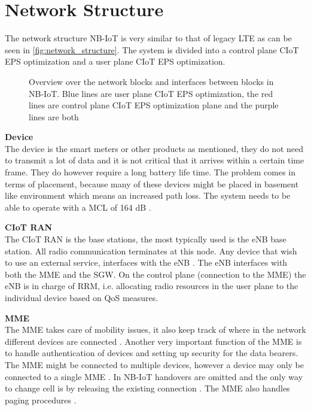  \section{Network Structure}

The network structure \gls{NB-IoT} is very similar to that of legacy \gls{LTE} as can be seen in \autoref{fig:network_structure}. The system is divided into a control plane \gls{CIoT} \gls{EPS} optimization and a user plane \gls{CIoT} \gls{EPS} optimization.

\begin{figure}[H]
\centering

\caption{Overview over the network blocks and interfaces between blocks in \gls{NB-IoT}. Blue lines are user plane \gls{CIoT} \gls{EPS} optimization, the red lines are control plane \gls{CIoT} \gls{EPS} optimization plane and the purple lines are both \citep{NB_slide}}
\label{fig:network_structure}
\end{figure}


\textbf{Device}\\
The device is the smart meters or other products as mentioned, they do not need to transmit a lot of data and it is not critical that it arrives within a certain time frame. They do however require a long battery life time. The problem comes in terms of placement, because many of these devices might be placed in basement like environment which means an increased path loss. The system needs to be able to operate with a \gls{MCL} of 164 dB \citep{REL-13,book_LTE_for_UMTS}.

\textbf{\gls{CIoT} \gls{RAN}}\\
The \gls{CIoT} \gls{RAN} is the base stations, the most typically used is the \gls{eNB} base station. All radio communication terminates at this node. Any device that wish to use an external service, interfaces with the \gls{eNB} \citep{book_LTE_for_UMTS}. The \gls{eNB} interfaces with both the \gls{MME} and the \gls{SGW}. On the control plane (connection to the \gls{MME}) the \gls{eNB} is in charge of \gls{RRM}, i.e. allocating radio resources in the user plane to the individual device based on \gls{QoS} measures. 

\textbf{\gls{MME}}\\
The \gls{MME} takes care of mobility issues, it also keep track of where in the network different devices are connected . Another very important function of the \gls{MME} is to handle authentication of devices and setting up security for the data bearers. The \gls{MME} might be connected to multiple devices, however a device may only be connected to a single \gls{MME} \citep[ch. 3]{book_LTE_for_UMTS}. In \gls{NB-IoT} handovers are omitted and the only way to change cell is by releasing the existing connection \citep{REL-13}. The \gls{MME} also handles paging procedures \citep{NB-IoT_Book}.

